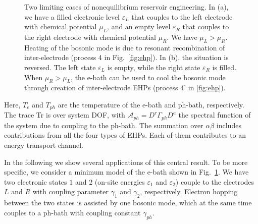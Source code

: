\documentclass[aps,prb,
,floatfix,footinbib,shortbibliography,
preprint
]{revtex4-1}
\begin{document}
\begin{figure}[h]
	\centering
	\quad
	\caption{Two limiting cases of nonequilibrium reservoir engineering. In (a), we have a filled electronic level $\varepsilon_L$ that couples to the left electrode with chemical potential $\mu_L$, and an empty level $\varepsilon_R$ that couples to the right electrode with chemical potential $\mu_R$. We have $\mu_L>\mu_R$. Heating of the bosonic mode is due to resonant recombination of inter-electrode (process 4 in Fig.~\ref{fig:ehp}). In (b), the situation is reversed. The left state $\varepsilon_L$ is empty, while the right state $\varepsilon_R$ is filled. When $\mu_R>\mu_L$, the e-bath can be used to cool the bosonic mode through creation of inter-electrode EHPs (process 4' in \ref{fig:ehp}). }
	\label{fig:resonant}
\end{figure}

Here, $T_e$ and $T_{ph}$ are the temperature of the e-bath and ph-bath, respectively. The trace Tr is over system DOF, with $\mathcal{A}_{ph}=D^r \Gamma_{ph} D^a$ the spectral function of the system due to coupling to the ph-bath. The summation over $\alpha\beta$ includes contributions from all the four types of EHPs. Each of them contributes to an energy transport channel. 



In the following we show several applications of this central result.
To be more specific, we consider a minimum model of the e-bath shown in Fig.~\ref{fig:resonant}. We have two electronic states $1$ and $2$ (on-site energies $\varepsilon_1$ and $\varepsilon_2$) couple to the electrodes $L$ and $R$ with coupling parameter $\gamma_1$ and $\gamma_2$, respectively. 
Electron hopping between the two states is assisted by one bosonic mode, which at the same time couples to a ph-bath with coupling constant $\gamma_{ph}$.
\end{document}
